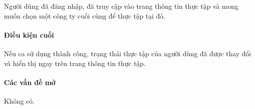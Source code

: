 \documentclass[./../main.tex]{subfiles}
\begin{document}
Người dùng đã đăng nhập, đã truy cập vào trang thông tin thực tập và
mong muốn chọn một công ty cuối cùng để thực tập tại đó.

\paragraph*{Điều kiện cuối}

Nếu ca sử dụng thành công, trạng thái thực tập của người dùng đã được
thay đổi và hiển thị ngay trên trang thông tin thực tập.

\paragraph*{Các vấn đề mở}

Không có.
\end{document}

